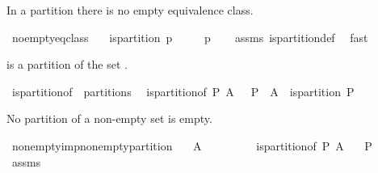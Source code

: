\begin{isabellebody}
%
\endisatagproof
{\isafoldproof}%
%
\isadelimproof
%
\endisadelimproof
%
\begin{isamarkuptext}%
In a partition there is no empty equivalence class.%
\end{isamarkuptext}%
\isamarkuptrue%
\isamarkupfalse%
\ no{\isacharunderscore}empty{\isacharunderscore}eq{\isacharunderscore}class{\isacharcolon}\isanewline
\ \ \ {\isachardoublequoteopen}is{\isacharunderscore}partition\ p{\isachardoublequoteclose}\isanewline
\ \ \ {\isachardoublequoteopen}{\isacharbraceleft}{\isacharbraceright}\ {\isasymnotin}\ p{\isachardoublequoteclose}\isanewline
%
\isadelimproof
\isanewline
\ \ %
\endisadelimproof
%
\isatagproof
{}\isamarkupfalse%
\ assms\ is{\isacharunderscore}partition{\isacharunderscore}def\ \isamarkupfalse%
\ fast%
\endisatagproof
{\isafoldproof}%
%
\isadelimproof
%
\endisadelimproof
%
\begin{isamarkuptext}%
 is a partition of the set .%
\end{isamarkuptext}%
\isamarkuptrue%
\isamarkupfalse%
\ is{\isacharunderscore}partition{\isacharunderscore}of\ {\isacharparenleft}\ {\isachardoublequoteopen}partitions{\isachardoublequoteclose}\ {}{}{\isacharparenright}\isanewline
{}\ {\isachardoublequoteopen}is{\isacharunderscore}partition{\isacharunderscore}of\ P\ A\ {\isacharequal}\ {\isacharparenleft}{\isasymUnion}\ P\ {\isacharequal}\ A\ {\isasymand}\ is{\isacharunderscore}partition\ P{\isacharparenright}{\isachardoublequoteclose}%
\begin{isamarkuptext}%
No partition of a non-empty set is empty.%
\end{isamarkuptext}%
\isamarkuptrue%
\isamarkupfalse%
\ non{\isacharunderscore}empty{\isacharunderscore}imp{\isacharunderscore}non{\isacharunderscore}empty{\isacharunderscore}partition{\isacharcolon}\isanewline
\ \ \ {\isachardoublequoteopen}A\ {\isasymnoteq}\ {\isacharbraceleft}{\isacharbraceright}{\isachardoublequoteclose}\isanewline
\ \ \ \ \ \ \ {\isachardoublequoteopen}is{\isacharunderscore}partition{\isacharunderscore}of\ P\ A{\isachardoublequoteclose}\isanewline
\ \ \ {\isachardoublequoteopen}P\ {\isasymnoteq}\ {\isacharbraceleft}{\isacharbraceright}{\isachardoublequoteclose}\isanewline
%
\isadelimproof
%
\endisadelimproof
%
\isatagproof
{}\isamarkupfalse%
\ assms\isanewline
{}\isamarkupfalse%

\end{isabellebody}
